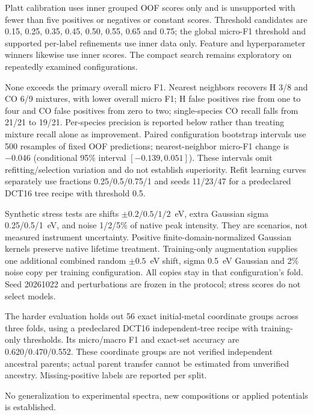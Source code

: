 Platt calibration uses inner grouped OOF scores only and is unsupported with fewer than five positives or negatives or constant scores. Threshold candidates are 0.15, 0.25, 0.35, 0.45, 0.50, 0.55, 0.65 and 0.75; the global micro-F1 threshold and supported per-label refinements use inner data only. Feature and hyperparameter winners likewise use inner scores. The compact search remains exploratory on repeatedly examined configurations.



None exceeds the primary overall micro F1. Nearest neighbors recovers H 3/8 and CO 6/9 mixtures, with lower overall micro F1; H false positives rise from one to four and CO false positives from zero to two; single-species CO recall falls from 21/21 to 19/21. Per-species precision is reported below rather than treating mixture recall alone as improvement. Paired configuration bootstrap intervals use 500 resamples of fixed OOF predictions; nearest-neighbor micro-F1 change is $-0.046$ (conditional 95\% interval $[-0.139,0.051]$). These intervals omit refitting/selection variation and do not establish superiority. Refit learning curves separately use fractions 0.25/0.5/0.75/1 and seeds 11/23/47 for a predeclared DCT16 tree recipe with threshold 0.5.

Synthetic stress tests are shifts $\pm0.2/0.5/1/2$~eV, extra Gaussian sigma 0.25/0.5/1~eV, and noise 1/2/5\% of native peak intensity. They are scenarios, not measured instrument uncertainty. Positive finite-domain-normalized Gaussian kernels preserve native lifetime treatment. Training-only augmentation supplies one additional combined random $\pm0.5$~eV shift, sigma 0.5~eV Gaussian and 2\% noise copy per training configuration. All copies stay in that configuration's fold. Seed 20261022 and perturbations are frozen in the protocol; stress scores do not select models.

The harder evaluation holds out 56 exact initial-metal coordinate groups across three folds, using a predeclared DCT16 independent-tree recipe with training-only thresholds. Its micro/macro F1 and exact-set accuracy are 0.620/0.470/0.552. These coordinate groups are not verified independent ancestral parents; actual parent transfer cannot be estimated from unverified ancestry. Missing-positive labels are reported per split.

 No generalization to experimental spectra, new compositions or applied potentials is established.



